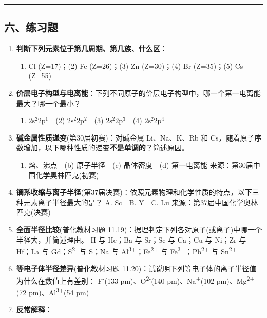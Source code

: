 \documentclass[a4paper,11pt]{ctexart}
\providecommand{\tightlist}{\setlength{\itemsep}{0pt}\setlength{\parskip}{0pt}}
\newcommand{\箭}{\ensuremath{\rightarrow}}
\newcommand{\左箭}{\ensuremath{\leftarrow}}
\newcommand{\上箭}{\ensuremath{\uparrow}}
\newcommand{\下箭}{\ensuremath{\downarrow}}
\newcommand{\衡}{\ensuremath{\rightleftharpoons}}
\newcommand{\双箭}{\ensuremath{\leftrightarrow}}
\newcommand{\约等于}{\ensuremath{\approx}}
\newcommand{\小于等于}{\ensuremath{\leq}}
\newcommand{\大于等于}{\ensuremath{\geq}}
\newcommand{\不等于}{\ensuremath{\neq}}
\newcommand{\西格马}{\ensuremath{\sigma}}
\newcommand{\派}{\ensuremath{\pi}}
\begin{document}
\begin{center}\rule{0.5\linewidth}{0.5pt}\end{center}

\subsection{六、练习题}\label{ux516dux7ec3ux4e60ux9898}

\begin{enumerate}
\def\labelenumi{\arabic{enumi}.}
\item
  \textbf{判断下列元素位于第几周期、第几族、什么区}：

  \begin{enumerate}
  \def\labelenumii{(\arabic{enumii})}
  \tightlist
  \item
    Cl (Z=17)；(2) Fe (Z=26)；(3) Zn (Z=30)；(4) Br (Z=35)；(5) Cs (Z=55)
  \end{enumerate}
\item
  \textbf{价层电子构型与电离能}：下列不同原子的价层电子构型中，哪一个第一电离能最大？哪一个最小？

  \begin{enumerate}
  \def\labelenumii{(\arabic{enumii})}
  \tightlist
  \item
    \(2\mathrm{s}^2 2\mathrm{p}^1\)　(2) \(2\mathrm{s}^2 2\mathrm{p}^2\)　(3) \(2\mathrm{s}^2 2\mathrm{p}^3\)　(4) \(2\mathrm{s}^2 2\mathrm{p}^4\)
  \end{enumerate}
\item
  \textbf{碱金属性质递变}(第30届初赛)：对碱金属 Li、Na、K、Rb 和 Cs，随着原子序数增加，以下哪种性质的递变\textbf{不是单调的}？简述原因。

  \begin{enumerate}
  \def\labelenumii{(\alph{enumii})}
  \tightlist
  \item
    熔、沸点　(b) 原子半径　(c) 晶体密度　(d) 第一电离能
    来源：第30届中国化学奥林匹克(初赛)
  \end{enumerate}
\item
  \textbf{镧系收缩与离子半径}(第37届决赛)：依照元素物理和化学性质的特点，以下三种元素离子半径最大的是？
  A. Sc　B. Y　C. Lu
  来源：第37届中国化学奥林匹克(决赛)
\item
  \textbf{全面半径比较}(普化教材习题 11.19)：据理判定下列各对原子(或离子)中哪一个半径大，并简述理由。
  H 与 He；Ba 与 Sr；Sc 与 Ca；Cu 与 Ni；Zr 与 Hf；La 与 Gd；S\textsuperscript{2-} 与 S；Na 与 Al\textsuperscript{3+}；Fe\textsuperscript{2+} 与 Fe\textsuperscript{3+}；Pb\textsuperscript{2+} 与 Sn\textsuperscript{2+}
\item
  \textbf{等电子体半径差异}(普化教材习题 11.20)：试说明下列等电子体的离子半径值为什么在数值上有差别：
  F\textsuperscript{-}(133 pm)、O\textsuperscript{2-}(140 pm)、Na\textsuperscript{+}(102 pm)、Mg\textsuperscript{2+}(72 pm)、Al\textsuperscript{3+}(54 pm)
\item
  \textbf{反常解释}：


\end{enumerate}
\end{document}
